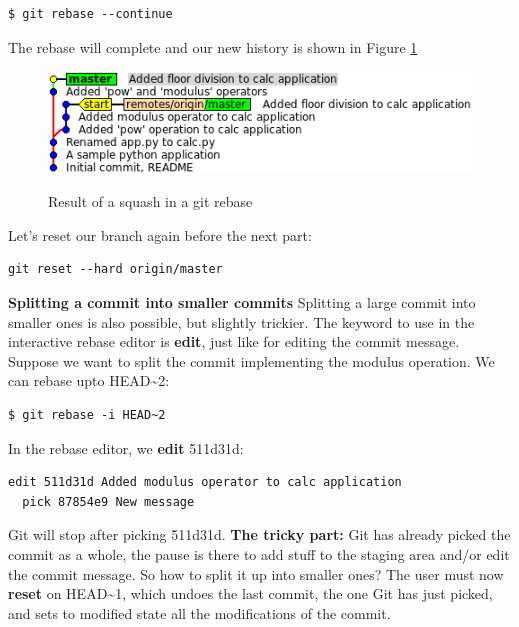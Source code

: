 \documentclass{../common/tufte-latex/tufte-handout}
\begin{document}
\begin{lstlisting}[style=BashInputStyle]
  $ git rebase --continue
\end{lstlisting}

The rebase will complete and our new history is shown in Figure \ref{fig:gitrebase-squash}

\begin{figure}%
  \centering
  \includegraphics[width=0.75\linewidth]{gitrebase-squash.png}
  \label{fig:gitrebase-squash}
  \caption{Result of a squash in a git rebase}
\end{figure}

Let's reset our branch again before the next part:

\begin{lstlisting}[style=BashInputStyle]
  git reset --hard origin/master
\end{lstlisting}

\noindent \textbf{Splitting a commit into smaller commits}
Splitting a large commit into smaller ones is also possible, but slightly trickier.
The keyword to use in the interactive rebase editor is \textbf{edit}, just like for editing the commit message.
Suppose we want to split the commit implementing the modulus operation.
We can rebase upto HEAD\textasciitilde2:

\begin{lstlisting}[style=BashInputStyle]
  $ git rebase -i HEAD~2
\end{lstlisting}

In the rebase editor, we \textbf{edit} 511d31d:
\begin{lstlisting}[style=BashInputStyle]
  edit 511d31d Added modulus operator to calc application
  pick 87854e9 New message
\end{lstlisting}

Git will stop after picking 511d31d.
\textbf{The tricky part:} Git has already picked the commit as a whole, the pause is there to add stuff to the staging area and/or edit the commit message.
So how to split it up into smaller ones?
The user must now \textbf{reset} on HEAD\textasciitilde1, which undoes the last commit, the one Git has just picked, and sets to modified state all the modifications of the commit.
\end{document}

